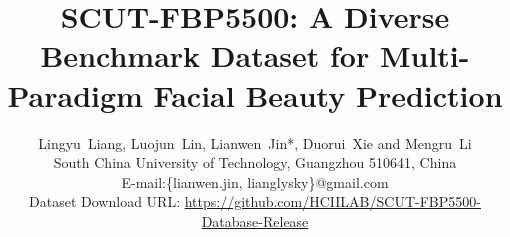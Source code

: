 \documentclass[10pt,conference,a4paper]{IEEEtran}
\begin{document}
\title{SCUT-FBP5500: A Diverse Benchmark Dataset for Multi-Paradigm Facial Beauty Prediction}



\author{Lingyu~Liang, Luojun~Lin, Lianwen~Jin*, Duorui~Xie and Mengru~Li\\
South China University of Technology, Guangzhou 510641, China\\
E-mail:\{lianwen.jin, lianglysky\}@gmail.com\\
Dataset Download URL: \underline{https://github.com/HCIILAB/SCUT-FBP5500-Database-Release}
}



















\maketitle

\renewcommand{\thefootnote}{\fnsymbol{footnote}} \setcounter{footnote}{-1}
\end{document}
